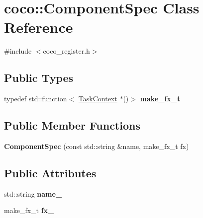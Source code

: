 \hypertarget{classcoco_1_1_component_spec}{}\section{coco\+:\+:Component\+Spec Class Reference}
\label{classcoco_1_1_component_spec}


{\ttfamily \#include $<$coco\+\_\+register.\+h$>$}

\subsection*{Public Types}
\begin{DoxyCompactItemize}
\item 
\hypertarget{classcoco_1_1_component_spec_a5192a251bc02eff1e313eaf942a5242b}{}typedef std\+::function$<$ \hyperlink{classcoco_1_1_task_context}{Task\+Context} $\ast$()$>$ {\bfseries make\+\_\+fx\+\_\+t}\label{classcoco_1_1_component_spec_a5192a251bc02eff1e313eaf942a5242b}

\end{DoxyCompactItemize}
\subsection*{Public Member Functions}
\begin{DoxyCompactItemize}
\item 
\hypertarget{classcoco_1_1_component_spec_ac59373f0d98f52e1261cde71f5b020d7}{}{\bfseries Component\+Spec} (const std\+::string \&name, make\+\_\+fx\+\_\+t fx)\label{classcoco_1_1_component_spec_ac59373f0d98f52e1261cde71f5b020d7}

\end{DoxyCompactItemize}
\subsection*{Public Attributes}
\begin{DoxyCompactItemize}
\item 
\hypertarget{classcoco_1_1_component_spec_a47822521036decc06ea24b6d238980d0}{}std\+::string {\bfseries name\+\_\+}\label{classcoco_1_1_component_spec_a47822521036decc06ea24b6d238980d0}

\item 
\hypertarget{classcoco_1_1_component_spec_ae9572e4b7470cd3f54f5e1c08db88a0c}{}make\+\_\+fx\+\_\+t {\bfseries fx\+\_\+}\label{classcoco_1_1_component_spec_ae9572e4b7470cd3f54f5e1c08db88a0c}

\end{DoxyCompactItemize}


